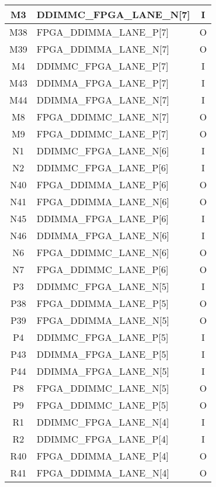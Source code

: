 \begin{longtable}[l]{| c | l | c |}
  M3   & DDIMMC\_FPGA\_LANE\_N[7]     & I   \\ \hline
  M38  & FPGA\_DDIMMA\_LANE\_P[7]     & O   \\ \hline
  M39  & FPGA\_DDIMMA\_LANE\_N[7]     & O   \\ \hline
  M4   & DDIMMC\_FPGA\_LANE\_P[7]     & I   \\ \hline
  M43  & DDIMMA\_FPGA\_LANE\_P[7]     & I   \\ \hline
  M44  & DDIMMA\_FPGA\_LANE\_N[7]     & I   \\ \hline
  M8   & FPGA\_DDIMMC\_LANE\_N[7]     & O   \\ \hline
  M9   & FPGA\_DDIMMC\_LANE\_P[7]     & O   \\ \hline
  N1   & DDIMMC\_FPGA\_LANE\_N[6]     & I   \\ \hline
  N2   & DDIMMC\_FPGA\_LANE\_P[6]     & I   \\ \hline
  N40  & FPGA\_DDIMMA\_LANE\_P[6]     & O   \\ \hline
  N41  & FPGA\_DDIMMA\_LANE\_N[6]     & O   \\ \hline
  N45  & DDIMMA\_FPGA\_LANE\_P[6]     & I   \\ \hline
  N46  & DDIMMA\_FPGA\_LANE\_N[6]     & I   \\ \hline
  N6   & FPGA\_DDIMMC\_LANE\_N[6]     & O   \\ \hline
  N7   & FPGA\_DDIMMC\_LANE\_P[6]     & O   \\ \hline
  P3   & DDIMMC\_FPGA\_LANE\_N[5]     & I   \\ \hline
  P38  & FPGA\_DDIMMA\_LANE\_P[5]     & O   \\ \hline
  P39  & FPGA\_DDIMMA\_LANE\_N[5]     & O   \\ \hline
  P4   & DDIMMC\_FPGA\_LANE\_P[5]     & I   \\ \hline
  P43  & DDIMMA\_FPGA\_LANE\_P[5]     & I   \\ \hline
  P44  & DDIMMA\_FPGA\_LANE\_N[5]     & I   \\ \hline
  P8   & FPGA\_DDIMMC\_LANE\_N[5]     & O   \\ \hline
  P9   & FPGA\_DDIMMC\_LANE\_P[5]     & O   \\ \hline
  R1   & DDIMMC\_FPGA\_LANE\_N[4]     & I   \\ \hline
  R2   & DDIMMC\_FPGA\_LANE\_P[4]     & I   \\ \hline
  R40  & FPGA\_DDIMMA\_LANE\_P[4]     & O   \\ \hline
  R41  & FPGA\_DDIMMA\_LANE\_N[4]     & O   \\ \hline

\end{longtable}
